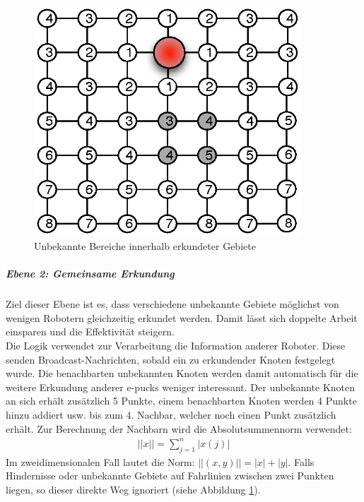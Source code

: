 \documentclass[10pt,a4paper]{article}
\begin{document}
					\begin{figure}[h]
						\centering
						\includegraphics[width=10cm]{images/eingeschlossen.eps}
  						\caption{Unbekannte Bereiche innerhalb erkundeter Gebiete}
  						\label{fig:level1}
  					\end{figure}
  				\subparagraph*{Ebene 2: Gemeinsame Erkundung} Ziel dieser Ebene ist es, dass verschiedene unbekannte Gebiete möglichst von
  					wenigen Robotern gleichzeitig erkundet werden. Damit lässt sich doppelte Arbeit einsparen und die Effektivität steigern.\\
  					Die Logik verwendet zur Verarbeitung die Information anderer Roboter. Diese senden Broadcast-Nachrichten, sobald ein zu erkundender
  					Knoten festgelegt wurde. Die benachbarten unbekannten Knoten werden damit automatisch für die weitere Erkundung anderer e-pucks
  					weniger interessant. Der unbekannte Knoten an sich erhält zusätzlich	5 	Punkte, einem benachbarten Knoten werden 4 Punkte hinzu
  					addiert usw. bis zum 4. Nachbar, welcher noch einen Punkt zusätzlich erhält. Zur Berechnung der Nachbarn wird die Absolutsummennorm
  					verwendet:
					\begin{eqnarray}
						||x|| = \sum_{j=1}^n |x(j)|
					\end{eqnarray}
					Im zweidimensionalen Fall lautet die Norm: $||(x,y)||=|x| + |y|$. Falls Hindernisse oder unbekannte Gebiete auf Fahrlinien zwischen
					zwei Punkten liegen, so dieser direkte Weg ignoriert (siehe Abbildung \ref{fig:level1}). 			
\end{document}
